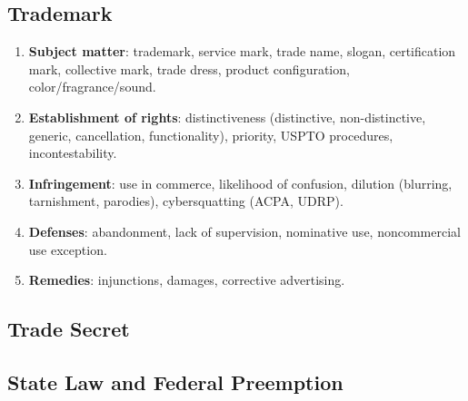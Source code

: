 \subsection{Trademark}

\begin{enumerate}
    \item \textbf{Subject matter}: trademark, service mark, trade name, 
    slogan, certification mark, collective mark, trade dress, product 
    configuration, color/fragrance/sound.
    \item \textbf{Establishment of rights}: distinctiveness (distinctive, 
    non-distinctive, generic, cancellation, functionality), priority, USPTO 
    procedures, incontestability.
    \item \textbf{Infringement}: use in commerce, likelihood of confusion, 
    dilution (blurring, tarnishment, parodies), cybersquatting (ACPA, UDRP).
    \item \textbf{Defenses}: abandonment, lack of supervision, nominative use, 
    noncommercial use exception.
    \item \textbf{Remedies}: injunctions, damages, corrective advertising.
\end{enumerate}

\subsection{Trade Secret}


\subsection{State Law and Federal Preemption}

